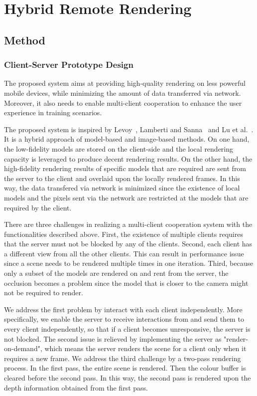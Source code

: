 \chapter{Hybrid Remote Rendering}
\label{chap:hrr}

\section{Method}

\subsection{Client-Server Prototype Design}

The proposed system aims at providing high-quality rendering on less powerful mobile devices, while minimizing the amount of data transferred via network.
Moreover, it also needs to enable multi-client cooperation to enhance the user experience in training scenarios.

The proposed system is inspired by Levoy~\cite{levoy1995}, Lamberti and Sanna~\cite{lamberti2007} and Lu et al.~\cite{lu2011}.
It is a hybrid approach of model-based and image-based methods.
On one hand, the low-fidelity models are stored on the client-side and the local rendering capacity is leveraged to produce decent rendering results.
On the other hand, the high-fidelity rendering results of specific models that are required are sent from the server to the client and overlaid upon the locally rendered frames.
In this way, the data transfered via network is minimized since the existence of local models and the pixels sent via the network are restricted at the models that are required by the client.

There are three challenges in realizing a multi-client cooperation system with the functionalities described above.
First, the existence of multiple clients requires that the server must not be blocked by any of the clients.
Second, each client has a different view from all the other clients. This can result in performance issue since a scene needs to be rendered multiple times in one iteration.
Third, because only a subset of the models are rendered on and rent from the server, the occlusion becomes a problem since the model that is closer to the camera might not be required to render.

We address the first problem by interact with each client independently. More specifically, we enable the server to receive interactions from and send them to every client independently, so that if a client becomes unresponsive, the server is not blocked.
The second issue is relieved by implementing the server as "render-on-demand", which means the server renders the scene for a client only when it requires a new frame.
We address the third challenge by a two-pass rendering process. In the first pass, the entire scene is rendered. Then the colour buffer is cleared before the second pass. In this way, the second pass is rendered upon the depth information obtained from the first pass.

